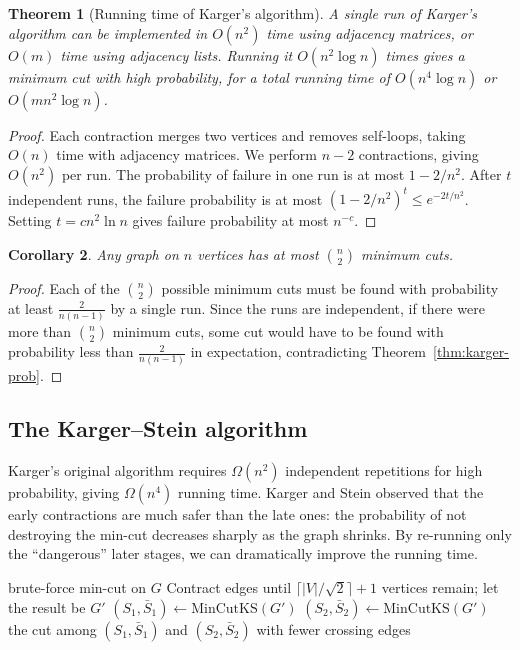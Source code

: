 \documentclass[twoside,12pt]{book}
\theoremstyle{plain}
\newtheorem{theorem}{Theorem}[chapter]
\newtheorem{corollary}[theorem]{Corollary}
\theoremstyle{definition}
\theoremstyle{remark}
\begin{document}
\begin{theorem}[Running time of Karger's algorithm]
A single run of Karger's algorithm can be implemented in $O(n^2)$ time using adjacency matrices, or $O(m)$ time using adjacency lists. Running it $O(n^2 \log n)$ times gives a minimum cut with high probability, for a total running time of $O(n^4 \log n)$ or $O(mn^2 \log n)$.
\end{theorem}

\begin{proof}
Each contraction merges two vertices and removes self-loops, taking $O(n)$ time with adjacency matrices. We perform $n - 2$ contractions, giving $O(n^2)$ per run. The probability of failure in one run is at most $1 - 2/n^2$. After $t$ independent runs, the failure probability is at most $(1 - 2/n^2)^t \leq e^{-2t/n^2}$. Setting $t = cn^2 \ln n$ gives failure probability at most $n^{-c}$.
\end{proof}

\begin{corollary}
Any graph on $n$ vertices has at most $\binom{n}{2}$ minimum cuts.
\end{corollary}

\begin{proof}
Each of the $\binom{n}{2}$ possible minimum cuts must be found with probability at least $\frac{2}{n(n-1)}$ by a single run. Since the runs are independent, if there were more than $\binom{n}{2}$ minimum cuts, some cut would have to be found with probability less than $\frac{2}{n(n-1)}$ in expectation, contradicting Theorem~\ref{thm:karger-prob}.
\end{proof}

\subsection{The Karger--Stein algorithm}

Karger's original algorithm requires $\Omega(n^2)$ independent repetitions for high probability, giving $\Omega(n^4)$ running time. Karger and Stein observed that the early contractions are much safer than the late ones: the probability of not destroying the min-cut decreases sharply as the graph shrinks. By re-running only the ``dangerous'' later stages, we can dramatically improve the running time.

\begin{algorithm}
\caption{Karger--Stein Recursive Contraction}
\label{alg:karger-stein}
\begin{algorithmic}[1]
        \State \Return brute-force min-cut on $G$
    \EndIf
    \State Contract edges until $\lceil |V| / \sqrt{2} \rceil + 1$ vertices remain; let the result be $G'$
    \State $(S_1, \bar{S}_1) \gets \text{MinCutKS}(G')$ 
    \State $(S_2, \bar{S}_2) \gets \text{MinCutKS}(G')$ 
    \State \Return the cut among $(S_1, \bar{S}_1)$ and $(S_2, \bar{S}_2)$ with fewer crossing edges
\EndFunction
\end{algorithmic}
\end{algorithm}
\end{document}

